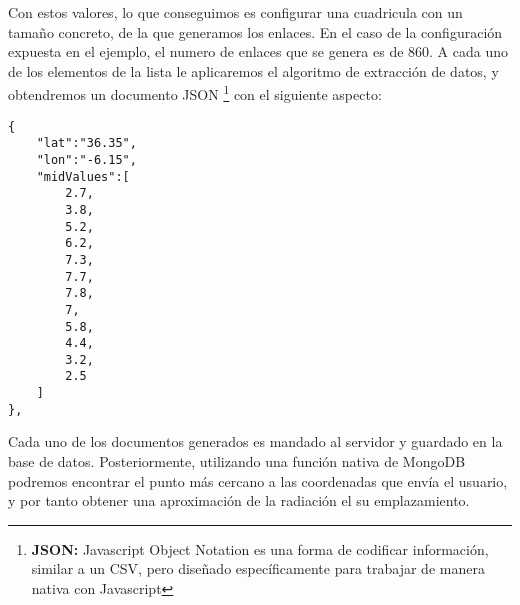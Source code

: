 Con estos valores, lo que conseguimos es configurar una cuadricula con un tamaño concreto, de la que generamos los enlaces. En el caso de la configuración expuesta en el ejemplo, el numero de enlaces que se genera es de 860. A cada uno de los elementos de la lista le aplicaremos el algoritmo de extracción de datos, y obtendremos un documento JSON \footnote{\textbf{JSON:} Javascript Object Notation es una forma de codificar información, similar a un CSV, pero diseñado específicamente para trabajar de manera nativa con Javascript} con el siguiente aspecto:

\begin{lstlisting}[style=ES6, caption={Ejemplo de un documento JSON con la información de un punto concreto \label{code:json_example}}]
{
    "lat":"36.35",
    "lon":"-6.15",
    "midValues":[
        2.7,
        3.8,
        5.2,
        6.2,
        7.3,
        7.7,
        7.8,
        7,
        5.8,
        4.4,
        3.2,
        2.5
    ]
},
\end{lstlisting}

Cada uno de los documentos generados es mandado al servidor y guardado en la base de datos. Posteriormente, utilizando una función nativa de MongoDB podremos encontrar el punto más cercano a las coordenadas que envía el usuario, y por tanto obtener una aproximación de la radiación el su emplazamiento.
